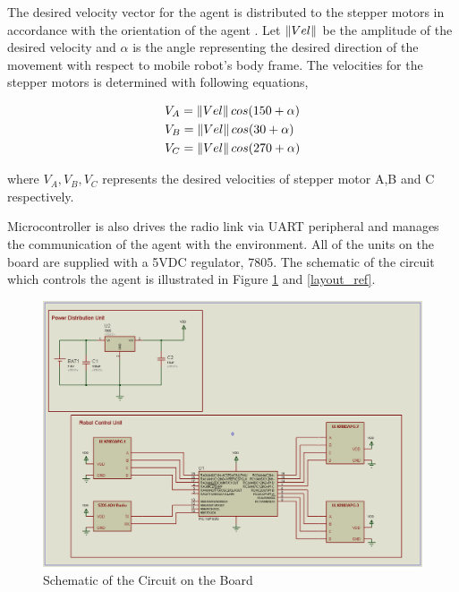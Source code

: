The desired velocity vector for the agent is  distributed to the stepper motors in accordance with the orientation of the agent . Let $\left\lVert Vel\right\rVert$ be the amplitude of the desired velocity and $\alpha$ is the angle representing the desired direction of the movement with respect to mobile robot's body frame.  The velocities for the stepper motors is determined with following equations,
		
\begin{align*}
& V_A = \left\lVert Vel\right\rVert cos(150+\alpha) \\
& V_B = \left\lVert Vel\right\rVert cos(30 +\alpha) \\
& V_C = \left\lVert Vel\right\rVert cos(270+\alpha) 
\end{align*}  

where $V_A, V_B, V_C$ represents the desired velocities of  stepper motor A,B and C respectively.
		
Microcontroller is also drives the radio link via UART peripheral and manages the communication of the agent with the environment. All of the units on the board are supplied with a 5VDC regulator, 7805. The schematic of the circuit which controls the agent is illustrated in Figure \ref{sematik_ref} and \ref{layout_ref}.
		
\begin{figure}[H]
\caption{Schematic of the Circuit on the Board} \label{sematik_ref}
\centerline{\includegraphics[scale = 0.40]{sematik}}
\end{figure} 

